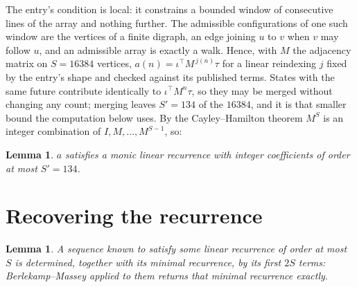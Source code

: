 \documentclass[11pt,a4paper]{article}
\theoremstyle{plain}
\newtheorem{lemma}[theorem]{Lemma}
\theoremstyle{definition}
\begin{document}
The entry's condition is local: it constrains a bounded window of consecutive lines of the
array and nothing further. The admissible configurations of one such window are the vertices
of a finite digraph, an edge joining $u$ to $v$ when $v$ may follow $u$, and an admissible
array is exactly a walk. Hence, with $M$ the adjacency matrix on $S=16384$ vertices,
$a(n)=\iota^{\!\top}M^{\,j(n)}\tau$ for a linear reindexing $j$ fixed by the entry's shape
and checked against its published terms. States with the same future contribute identically to $\iota^{\!\top}M^n\tau$, so they may be merged without changing any count; merging leaves $S'=134$ of the $16384$, and it is that smaller bound the computation below uses. By the Cayley--Hamilton theorem $M^{S}$ is an
integer combination of $I,M,\dots,M^{S-1}$, so:

\begin{lemma}\label{lem:cf}
$a$ satisfies a monic linear recurrence with integer coefficients of order at most
$S'=134$.
\end{lemma}

\section{Recovering the recurrence}

\begin{lemma}\label{lem:bm}
A sequence known to satisfy some linear recurrence of order at most $S$ is determined, together
with its minimal recurrence, by its first $2S$ terms: Berlekamp--Massey applied to them returns
that minimal recurrence exactly.
\end{lemma}
\end{document}
